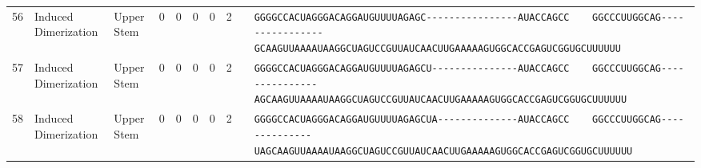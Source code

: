 \begin{tabular}{rllrrrrrcl}
 56 & Induced Dimerization & Upper Stem & 0 & 0 & 0 & 0 & 2 &  &
 \color{ucsfdarkgrey}\verb|GGGGCCACUAGGGACAGGAU|\color{ucsforange}\verb|GUUUUA|\color{ucsfblue}\verb|GAGC----------------|\color{ucsfpurple}\verb|AUACCAGCC    GGCCCUUGGCAG|\color{ucsfblue}\verb|----------------GCAAGU|\color{ucsforange}\verb|UAAAAUAA|\color{ucsfnavy}\verb|GGCUAGUCC|\color{ucsforange}\verb|GUUAUCA|\color{ucsfteal}\verb|ACUUGAAAAAGUG|\color{ucsforange}\verb|GCACCGAGUCGGUGCUUUUUU| \\

 57 & Induced Dimerization & Upper Stem & 0 & 0 & 0 & 0 & 2 &  &
 \color{ucsfdarkgrey}\verb|GGGGCCACUAGGGACAGGAU|\color{ucsforange}\verb|GUUUUA|\color{ucsfblue}\verb|GAGCU---------------|\color{ucsfpurple}\verb|AUACCAGCC    GGCCCUUGGCAG|\color{ucsfblue}\verb|---------------AGCAAGU|\color{ucsforange}\verb|UAAAAUAA|\color{ucsfnavy}\verb|GGCUAGUCC|\color{ucsforange}\verb|GUUAUCA|\color{ucsfteal}\verb|ACUUGAAAAAGUG|\color{ucsforange}\verb|GCACCGAGUCGGUGCUUUUUU| \\

 58 & Induced Dimerization & Upper Stem & 0 & 0 & 0 & 0 & 2 &  &
 \color{ucsfdarkgrey}\verb|GGGGCCACUAGGGACAGGAU|\color{ucsforange}\verb|GUUUUA|\color{ucsfblue}\verb|GAGCUA--------------|\color{ucsfpurple}\verb|AUACCAGCC    GGCCCUUGGCAG|\color{ucsfblue}\verb|--------------UAGCAAGU|\color{ucsforange}\verb|UAAAAUAA|\color{ucsfnavy}\verb|GGCUAGUCC|\color{ucsforange}\verb|GUUAUCA|\color{ucsfteal}\verb|ACUUGAAAAAGUG|\color{ucsforange}\verb|GCACCGAGUCGGUGCUUUUUU| \\

\bottomrule
\end{tabular}
